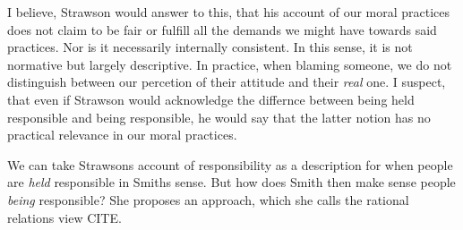 \documentclass{article}
\begin{document}
 I believe, Strawson would answer to this, that his account of our moral practices
 does not claim to be fair or fulfill all the demands we might have towards said
 practices. Nor is it necessarily internally consistent. In this sense, it is
 not normative but largely descriptive. In practice, when blaming someone, we do
 not distinguish between our percetion of their attitude and their \textit{real}
 one. I suspect, that even if Strawson would acknowledge the differnce
 between being held responsible and being responsible, he would say that the
 latter notion has no practical relevance in our moral practices.

 We can take Strawsons account of responsibility as a description for when
 people are \textit{held} responsible in Smiths sense. But how does Smith then
 make sense people \textit{being} responsible? She proposes an approach, which
 she calls the rational relations view CITE.
\end{document}
